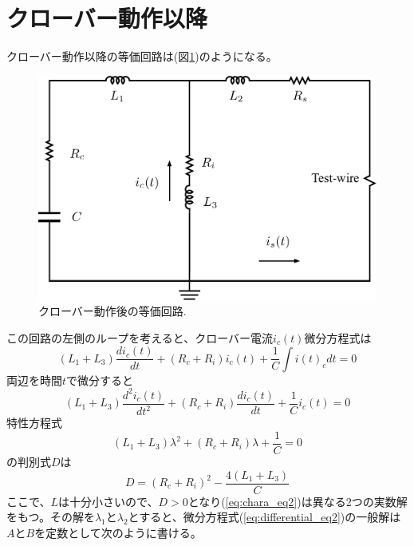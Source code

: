 \documentclass[book,openany]{jlreq}
\theoremstyle{definition}
\begin{document}
\section{クローバー動作以降}

クローバー動作以降の等価回路は(図\ref{fig:AfterCrowbar})のようになる。
%
\begin{figure}[htbp]
  \begin{center}
    \includegraphics[width=12cm]{figs/AfterCRB.pdf}
    \caption{クローバー動作後の等価回路.}
    \label{fig:AfterCrowbar}
  \end{center}
\end{figure}
%
この回路の左側のループを考えると、クローバー電流$i_c(t)$微分方程式は
%
\begin{equation}
  (L_1+L_3) \frac{di_c(t)}{dt} + (R_c+R_i) i_c(t) + \frac{1}{C} \int i(t)_c dt = 0
\end{equation}
%
両辺を時間$t$で微分すると
%
\begin{equation}
  (L_1+L_3)\frac{d^2i_c(t)}{dt^2} + (R_c+R_i) \frac{di_c(t)}{dt} + \frac{1}{C} i_c(t) = 0
  \label{eq:differential_eq2}
\end{equation}
%
特性方程式
%
\begin{equation}
  (L_1+L_3)\lambda^2 + (R_c+R_i)  \lambda + \frac{1}{C} = 0
  \label{eq:chara_eq2}
\end{equation}
%
の判別式$D$は
%
\begin{equation}
  D = (R_c+R_i)^2 -\frac{4 (L_1+L_3)}{C}
\end{equation}
%
ここで、$L$は十分小さいので、$D>0$となり(\ref{eq:chara_eq2})は異なる2つの実数解をもつ。その解を$\lambda_1$と$\lambda_2$とすると、微分方程式(\ref{eq:differential_eq2})の一般解は$A$と$B$を定数として次のように書ける。
\end{document}
